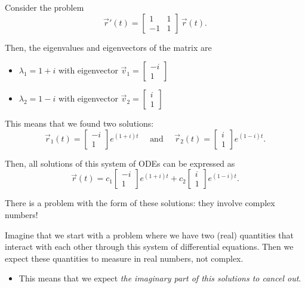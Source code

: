 \begin{example}
Consider the problem
$$
\vec{r}'(t) = \begin{bmatrix}	
 1 & 1 \\ -1 & 1
 \end{bmatrix} \, \vec{r}(t).
$$

Then, the eigenvalues and eigenvectors of the matrix are
\begin{itemize}
	\item $\lambda_1=1+i$ with eigenvector $\vec{v}_1 = \begin{bmatrix} -i \\ 1 \end{bmatrix}$
	\item $\lambda_2=1-i$ with eigenvector $\vec{v}_2 = \begin{bmatrix} i \\ 1 \end{bmatrix}$
\end{itemize}

This means that we found two solutions:
$$
\vec{r}_1(t) = \begin{bmatrix} -i \\ 1 \end{bmatrix} e^{(1+i)t}
\quad \text{ and } \quad \vec{r}_2(t) = \begin{bmatrix} i \\ 1 \end{bmatrix} e^{(1-i)t}.
$$

Then, all solutions of this system of ODEs can be expressed as
$$
\vec{r}(t) = c_1 \begin{bmatrix} -i \\ 1 \end{bmatrix} e^{(1+i)t}
+c_2\begin{bmatrix} i \\ 1 \end{bmatrix} e^{(1-i)t}.
$$

There is a problem with the form of these solutions: they involve complex numbers!

Imagine that we start with a problem where we have two (real) quantities that interact with each other through this system of differential equations.
Then we expect these quantities to measure in real numbers, not complex.

\begin{itemize}
	\item This means that we expect \emph{the imaginary part of this solutions to cancel out}.
\end{itemize}


\end{example}
